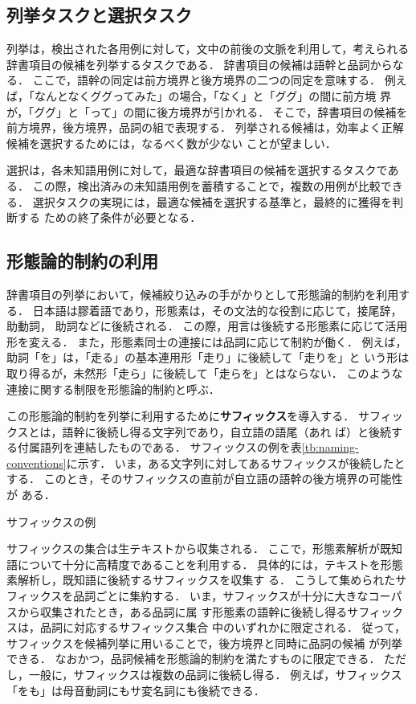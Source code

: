 \documentclass[japanese]{jnlp_1.4}
\begin{document}
\subsection{列挙タスクと選択タスク} \label{sec:enumeration-and-selection-tasks}

列挙は，検出された各用例に対して，文中の前後の文脈を利用して，考えられる
辞書項目の候補を列挙するタスクである．
辞書項目の候補は語幹と品詞からなる．
ここで，語幹の同定は前方境界と後方境界の二つの同定を意味する．
例えば，「なんとなくググってみた」の場合，「なく」と「ググ」の間に前方境
界が，「ググ」と「って」の間に後方境界が引かれる．
そこで，辞書項目の候補を前方境界，後方境界，品詞の組で表現する．
列挙される候補は，効率よく正解候補を選択するためには，なるべく数が少ない
ことが望ましい．

選択は，各未知語用例に対して，最適な辞書項目の候補を選択するタスクである．
この際，検出済みの未知語用例を蓄積することで，複数の用例が比較できる．
選択タスクの実現には，最適な候補を選択する基準と，最終的に獲得を判断する
ための終了条件が必要となる．


\subsection{形態論的制約の利用} \label{sec:enumeration-constraints}

辞書項目の列挙において，候補絞り込みの手がかりとして形態論的制約を利用す
る．
日本語は膠着語であり，形態素は，その文法的な役割に応じて，接尾辞，助動詞，
助詞などに後続される．
この際，用言は後続する形態素に応じて活用形を変える．
また，形態素同士の連接には品詞に応じて制約が働く．
例えば，助詞「を」は，「走る」の基本連用形「走り」に後続して「走りを」と
いう形は取り得るが，未然形「走ら」に後続して「走らを」とはならない．
このような連接に関する制限を形態論的制約と呼ぶ．


この形態論的制約を列挙に利用するために{\bf サフィックス}を導入する．
サフィックスとは，語幹に後続し得る文字列であり，自立語の語尾（あれ
ば）と後続する付属語列を連結したものである．
サフィックスの例を表\ref{tb:naming-conventions}に示す．
いま，ある文字列に対してあるサフィックスが後続したとする．
このとき，そのサフィックスの直前が自立語の語幹の後方境界の可能性が
ある．

\begin{table}[t]
    \caption{サフィックスの例}
    \label{tb:naming-conventions}

\end{table}

サフィックスの集合は生テキストから収集される．
ここで，形態素解析が既知語について十分に高精度であることを利用する．
具体的には，テキストを形態素解析し，既知語に後続するサフィックスを収集す
る．
こうして集められたサフィックスを品詞ごとに集約する．
いま，サフィックスが十分に大きなコーパスから収集されたとき，ある品詞に属
す形態素の語幹に後続し得るサフィックスは，品詞に対応するサフィックス集合
中のいずれかに限定される．
従って，サフィックスを候補列挙に用いることで，後方境界と同時に品詞の候補
が列挙できる．
なおかつ，品詞候補を形態論的制約を満たすものに限定できる．
ただし，一般に，サフィックスは複数の品詞に後続し得る．
例えば，サフィックス「をも」は母音動詞にもサ変名詞にも後続できる．
\end{document}
